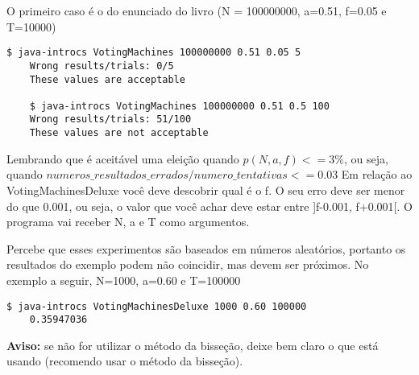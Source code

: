 \documentclass{article}
\begin{document}
\bigbreak
O primeiro caso \'e o do enunciado do livro (N = 100000000, a=0.51, f=0.05 e T=10000)
\begin{lstlisting}[breaklines, gobble=8]
	$ java-introcs VotingMachines 100000000 0.51 0.05 5
	Wrong results/trials: 0/5
	These values ​​are acceptable
	
	$ java-introcs VotingMachines 100000000 0.51 0.5 100
	Wrong results/trials: 51/100
	These values ​​are not acceptable
\end{lstlisting}
Lembrando que \'e aceit\'avel uma elei\c{c}\~ao quando $p(N, a, f) <= 3\%$, ou seja, quando $numeros\_resultados\_errados/numero\_tentativas <= 0.03$
\bigbreak
Em rela\c{c}\~ao ao VotingMachinesDeluxe voc\^e deve descobrir qual \'e o f. O seu erro deve ser menor do que 0.001, ou seja, o valor que voc\^e achar deve estar entre ]f-0.001, f+0.001[. O programa vai receber N, a e T como argumentos.

Percebe que esses experimentos s\~ao baseados em n\'umeros aleat\'orios, portanto os resultados do exemplo podem n\~ao coincidir, mas devem ser pr\'oximos.
\bigbreak
No exemplo a seguir, N=1000, a=0.60 e T=100000
\begin{lstlisting}[breaklines, gobble=8]
	$ java-introcs VotingMachinesDeluxe 1000 0.60 100000
	0.35947036
\end{lstlisting}
\bigbreak
\textbf{Aviso:} se n\~ao for utilizar o m\'etodo da bisse\c{c}\~ao, deixe bem claro o que est\'a usando (recomendo usar o m\'etodo da bisse\c{c}\~ao).
\end{document}
